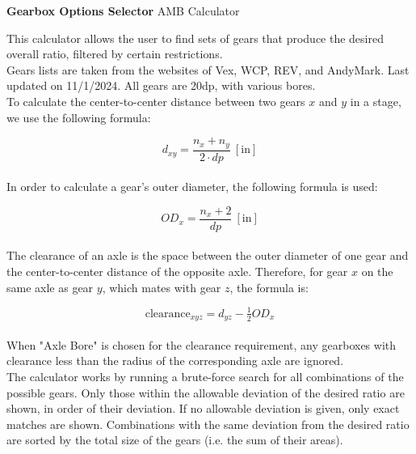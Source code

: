 \documentclass[a4paper]{article}
\begin{document}
	
	\Huge\textbf{Gearbox Options Selector}
	\newline
	\LARGE AMB Calculator
	
	\vspace{0.5cm}
	\normalsize
	
	This calculator allows the user to find sets of gears that produce the desired overall ratio, filtered by certain restrictions.\\
	
	Gears lists are taken from the websites of Vex, WCP, REV, and AndyMark. Last updated on 11/1/2024. All gears are 20dp, with various bores.\\
	
	To calculate the center-to-center distance between two gears $ x $ and $ y $ in a stage, we use the following formula:
	
	\begin{equation}
		d_{xy} = \frac{n_x + n_y}{2 \cdot dp}\ \left[ \text{in} \right]
	\end{equation}
	\\
	In order to calculate a gear's outer diameter, the following formula is used:
	
	\begin{equation}
		OD_x = \frac{n_x + 2}{dp}\ \left[ \text{in} \right]
	\end{equation}
	\\
	The clearance of an axle is the space between the outer diameter of one gear and the center-to-center distance of the opposite axle. Therefore, for gear $ x $ on the same axle as gear $ y $, which mates with gear $ z $, the formula is:
	
	\begin{equation}
		\text{clearance}_{xyz} = d_{yz} - \tfrac{1}{2} OD_x
	\end{equation}
	\\
	When "Axle Bore" is chosen for the clearance requirement, any gearboxes with clearance less than the radius of the corresponding axle are ignored.\\
	
	The calculator works by running a brute-force search for all combinations of the possible gears. Only those within the allowable deviation of the desired ratio are shown, in order of their deviation. If no allowable deviation is given, only exact matches are shown. Combinations with the same deviation from the desired ratio are sorted by the total size of the gears (i.e. the sum of their areas).
	
	
	\newpage
\end{document}
